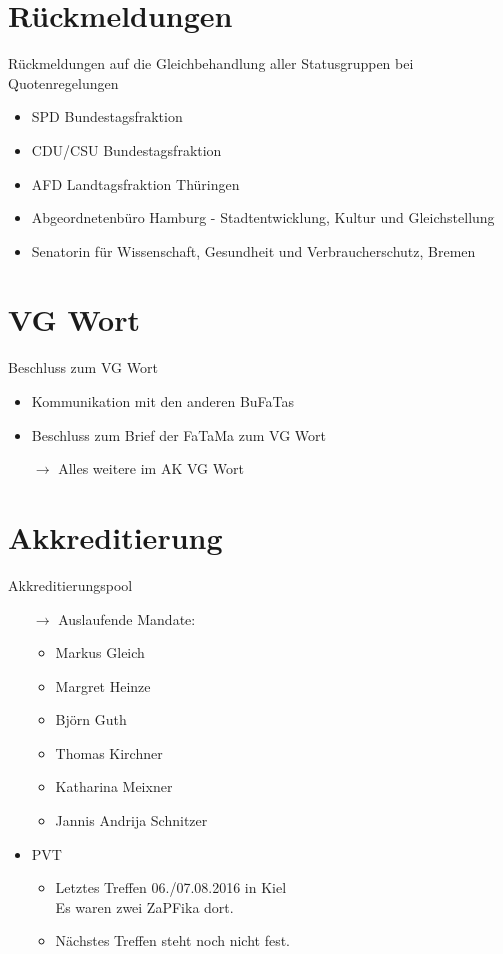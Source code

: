 \documentclass[compress, aspectratio=169]{beamer}
\begin{document}
\section{Rückmeldungen}

\begin{frame}{Rückmeldungen auf die Gleichbehandlung aller Statusgruppen bei Quotenregelungen}
	\begin{itemize}
		\item SPD Bundestagsfraktion
		\item CDU/CSU Bundestagsfraktion
		\item AFD Landtagsfraktion Thüringen
		\item Abgeordnetenbüro Hamburg - Stadtentwicklung, Kultur und Gleichstellung
		\item Senatorin für Wissenschaft, Gesundheit und Verbraucherschutz, Bremen
	\end{itemize}
\end{frame}

\section{VG Wort}

\begin{frame}{Beschluss zum VG Wort}
	\begin{itemize}
		\item Kommunikation mit den anderen BuFaTas
		\item Beschluss zum Brief der FaTaMa zum VG Wort
		\item[$\rightarrow$] Alles weitere im AK VG Wort
	\end{itemize}
\end{frame}

\section{Akkreditierung}

\begin{frame}{Akkreditierungspool}
	\begin{itemize}
		\item[$\rightarrow$] Auslaufende Mandate:
			\begin{itemize}
				\item Markus Gleich
				\item Margret Heinze
				\item Björn Guth
				\item Thomas Kirchner
				\item Katharina Meixner
				\item Jannis Andrija Schnitzer
			\end{itemize}
		\item PVT
			\begin{itemize}
				\item Letztes Treffen 06./07.08.2016 in Kiel\\
					Es waren zwei ZaPFika dort.
				\item Nächstes Treffen steht noch nicht fest.
			\end{itemize}
	\end{itemize}
\end{frame}
\end{document}
